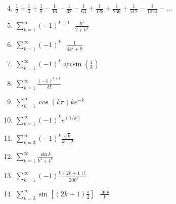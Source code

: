 \documentclass[12pt]{article}
\newif\ifans
\begin{document}

\medskip

\begin{enumerate}
\setcounter{enumi}{3}

\item $\frac{1}{2}+\frac{1}{4}+\frac{1}{8}-\frac{1}{16}-\frac{1}{32}-\frac{1}{64}+\frac{1}{128}+\frac{1}{256}+\frac{1}{512}-\frac{1}{1024}-\ldots$

\ifans{\fbox{converges absolutely}} \fi

\item $\sum_{k=1}^{\infty}{(-1)^{k+1} \text{ } \frac{k^2}{2+k^3}}$

\ifans{\fbox{converges conditionally}} \fi

\item $\sum_{k=1}^{\infty}{(-1)^{k} \text{ } \frac{1}{4k^2+9}}$

\ifans{\fbox{converges absolutely}} \fi

\item $\sum_{k=1}^{\infty}{(-1)^{k} \arcsin{\left(\frac{1}{k}\right)}}$

\ifans{\fbox{converges conditionally; Detailed Solution: \textcolor{blue}{\href{http://www.math.drexel.edu/classes/Calculus/resources/Math123HW/Solutions/123_10_Alternating_Series_7.pdf}{Here}}}} \fi

\item $\sum_{k=1}^{\infty}{\frac{(-1)^{k+1}}{k!}}$

\ifans{\fbox{converges absolutely}} \fi

\item $\sum_{k=1}^{\infty}{\cos({k\pi})ke^{-k}}$

\ifans{\fbox{converges absolutely; Detailed Solution: \textcolor{blue}{\href{http://www.math.drexel.edu/classes/Calculus/resources/Math123HW/Solutions/123_10_Alternating_Series_9.pdf}{Here}}}} \fi

\item $\sum_{k=1}^{\infty}{(-1)^k e^{(1/k) } }$

\ifans{\fbox{diverges}} \fi

\item $\sum_{k=3}^{\infty}{(-1)^k \frac{\sqrt{k}}{k-2} }$

\ifans{\fbox{converges conditionally}} \fi

\item $\sum_{k=1}^{\infty}{\frac{\sin{k}}{k^4+4^k} }$

\ifans{\fbox{converges absolutely}} \fi

\item $\sum_{k=1}^{\infty}{(-1)^k \frac{(2k+1)!}{200^k} }$

\ifans{\fbox{diverges}} \fi

\item $\sum_{k=3}^{\infty}{\sin\left[(2k+1)\frac{\pi}{2}\right] \text{ } \frac{\ln{k}}{k} }$

\ifans{\fbox{converges conditionally}} \fi

\end{enumerate}
\end{document}
